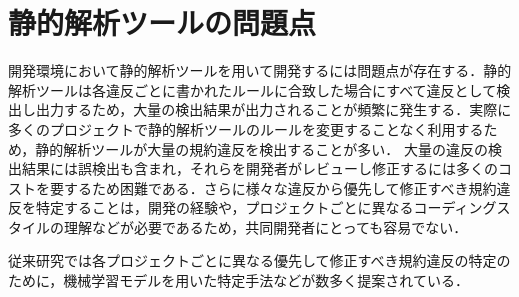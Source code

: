 \documentclass[11pt,dvipdfmx]{jreport}
\begin{document}

\section{静的解析ツールの問題点}

開発環境において静的解析ツールを用いて開発するには問題点が存在する．静的解析ツールは各違反ごとに書かれたルールに合致した場合にすべて違反として検出し出力するため，大量の検出結果が出力されることが頻繁に発生する．実際に多くのプロジェクトで静的解析ツールのルールを変更することなく利用するため，静的解析ツールが大量の規約違反を検出することが多い\cite{UsingStaticAnalysisTools2}．
大量の違反の検出結果には誤検出も含まれ，それらを開発者がレビューし修正するには多くのコストを要するため困難である．さらに様々な違反から優先して修正すべき規約違反を特定することは，開発の経験や，プロジェクトごとに異なるコーディングスタイルの理解などが必要であるため，共同開発者にとっても容易でない\cite{shuseisarenai}．

従来研究では各プロジェクトごとに異なる優先して修正すべき規約違反の特定のために，機械学習モデルを用いた特定手法などが数多く提案されている．

\end{document}
